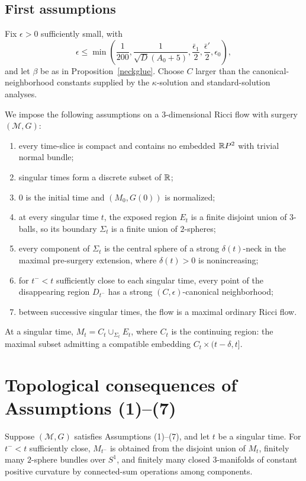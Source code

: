 \subsection{First assumptions}
\label{firstassumpt}

Fix $\epsilon>0$ sufficiently small, with
\[
  \epsilon\leq\min\left(\frac1{200},\frac1{\sqrt D(A_0+5)},
  \frac{\bar\epsilon_1}2,\frac{\bar\epsilon'}2,\epsilon_0\right),
\]
and let $\beta$ be as in Proposition~\ref{neckglue}. Choose
$C$ larger than the canonical-neighborhood constants supplied by the
$\kappa$-solution and standard-solution analyses.

We impose the following assumptions on a $3$-dimensional Ricci flow with
surgery $({\mathcal M},G)$:
\begin{enumerate}
\item[(1)] every time-slice is compact and contains no embedded $\mathbb{R} P^2$ with
trivial normal bundle;
\item[(2)] singular times form a discrete subset of $\mathbb{R}$;
\item[(3)] $0$ is the initial time and $(M_0,G(0))$ is normalized;
\item[(4)] at every singular time $t$, the exposed region $E_t$ is a finite
disjoint union of $3$-balls, so its boundary $\Sigma_t$ is a finite union of
$2$-spheres;
\item[(5)] every component of $\Sigma_t$ is the central sphere of a strong
$\delta(t)$-neck in the maximal pre-surgery extension, where $\delta(t)>0$ is
nonincreasing;
\item[(6)] for $t^-<t$ sufficiently close to each singular time, every point
of the disappearing region $D_{t^-}$ has a strong $(C,\epsilon)$-canonical
neighborhood;
\item[(7)] between successive singular times, the flow is a maximal ordinary
Ricci flow.
\end{enumerate}
At a singular time, $M_t=C_t\cup_{\Sigma_t}E_t$, where $C_t$ is the continuing
region: the maximal subset admitting a compatible embedding
$C_t\times(t-\delta,t]$.

\section{Topological consequences of Assumptions (1)--(7)}

\begin{proposition}
\label{prop:surgery-topological-type}
\label{surgerytoptype}
Suppose $({\mathcal M},G)$ satisfies Assumptions (1)--(7), and let $t$ be a
singular time. For $t^-<t$ sufficiently close, $M_{t^-}$ is obtained from the
disjoint union of $M_t$, finitely many $2$-sphere bundles over $S^1$, and finitely
many closed $3$-manifolds of constant positive curvature by connected-sum
operations among components.
\end{proposition}

